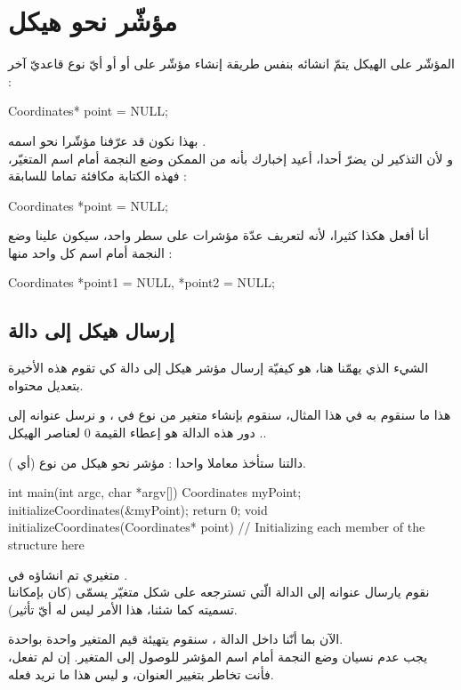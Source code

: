 \section{مؤشّر نحو هيكل}
المؤشّر على الهيكل يتمّ انشائه بنفس طريقة إنشاء مؤشّر على
أو
أو أيّ نوع قاعديّ آخر :
\begin{Csource}
Coordinates* point = NULL;
\end{Csource}
بهذا نكون قد عرّفنا مؤشّرا نحو
اسمه
.\\
و لأن التذكير لن يضرّ أحدا، أعيد إخبارك بأنه من الممكن وضع النجمة أمام اسم المتغيّر، فهذه الكتابة مكافئة تماما للسابقة :
\begin{Csource}
Coordinates *point = NULL;
\end{Csource}
أنا أفعل هكذا كثيرا، لأنه لتعريف عدّة مؤشرات على سطر واحد، سيكون علينا وضع النجمة أمام اسم كل واحد منها :
\begin{Csource}
Coordinates *point1 = NULL, *point2 = NULL;
\end{Csource}

\subsection{إرسال هيكل إلى دالة}
الشيء الذي يهمّنا هنا، هو كيفيّة إرسال مؤشر هيكل إلى دالة كي تقوم هذه الأخيرة بتعديل محتواه.

هذا ما سنقوم به في هذا المثال، سنقوم بإنشاء متغير من نوع
في
،
و نرسل عنوانه إلى
.
دور هذه الدالة هو إعطاء القيمة 0 لعناصر الهيكل.

دالتنا
ستأخذ معاملا واحدا : مؤشر نحو هيكل من نوع
(أي
).
\begin{Csource}
int main(int argc, char *argv[])
{
	Coordinates myPoint;
	initializeCoordinates(&myPoint);
	 return 0;
}
void initializeCoordinates(Coordinates* point)
{
	// Initializing each member of the structure here
}
\end{Csource}
متغيري
تم انشاؤه في
.\\
نقوم يارسال عنوانه إلى الدالة
الّتي تسترجعه على شكل متغيّر يسمّى
(كان بإمكاننا تسميته كما شئنا، هذا الأمر ليس له أيّ تأثير).

الآن بما أنّنا داخل الدالة
،
سنقوم يتهيئة قيم المتغير
واحدة بواحدة.\\
يجب عدم نسيان وضع النجمة أمام اسم المؤشر للوصول إلى المتغير. إن لم تفعل، فأنت تخاطر بتغيير العنوان، و ليس هذا ما نريد فعله.

